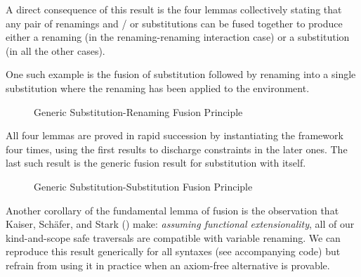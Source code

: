 A direct consequence of this result is the four lemmas collectively stating
that any pair of renamings and / or substitutions can be fused together to
produce either a renaming (in the renaming-renaming interaction case) or a
substitution (in all the other cases).

One such example is the fusion of substitution followed by renaming into a
single substitution where the renaming has been applied to the environment.

\begin{figure}[h]
\caption{Generic Substitution-Renaming Fusion Principle}
\end{figure}

All four lemmas are proved in rapid succession by instantiating the 
framework four times, using the first results to discharge constraints in the
later ones. The last such result is the generic fusion result for substitution
with itself.

\begin{figure}[h]
\caption{Generic Substitution-Substitution Fusion Principle}
\end{figure}

Another corollary of the fundamental lemma of fusion is the observation that
Kaiser, Schäfer, and Stark (\citeyear{Kaiser-wsdebr}) make: \emph{assuming
functional extensionality}, all of our kind-and-scope safe traversals are
compatible with variable renaming. We can reproduce this result generically
for all syntaxes (see accompanying code) but refrain from using it in practice
when an axiom-free alternative is provable.
